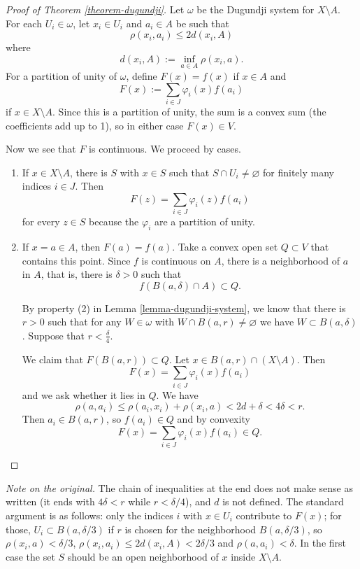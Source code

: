 \begin{proof}[Proof of Theorem
\ref{theorem-dugundji}]
Let $\omega$ be the Dugundji system for
$X\setminus A$. For each
$U_i\in\omega$, let $x_i\in U_i$ and
$a_i\in A$ be such that
$$
\rho(x_i,a_i)\leq2d(x_i,A)
$$
where
$$
d(x_i,A):=\inf_{a\in A}\rho(x_i,a).
$$
For a partition of unity of $\omega$,
define $F(x)=f(x)$ if $x\in A$ and
$$
F(x):=\sum_{i\in J}\varphi_i(x)f(a_i)
$$
if $x\in X\setminus A$. Since this is a
partition of unity, the sum is a convex
sum (the coefficients add up to 1), so
in either case $F(x)\in V$.

Now we see that $F$ is continuous. We
proceed by cases.
\begin{enumerate}
\item If $x\in X\setminus A$, there is
$S$ with $x\in S$ such that
$S\cap U_i\neq\varnothing$ for finitely
many indices $i\in J$. Then
$$
F(z)=\sum_{i\in J}\varphi_i(z)f(a_i)
$$
for every $z\in S$ because the
$\varphi_i$ are a partition of unity.

\item If $x=a\in A$, then $F(a)=f(a)$.
Take a convex open set $Q\subset V$
that contains this point. Since $f$ is
continuous on $A$, there is a
neighborhood of $a$ in $A$, that is,
there is $\delta>0$ such that
$$
f(B(a,\delta)\cap A)\subset Q.
$$

By property (2) in
Lemma \ref{lemma-dugundji-system}, we
know that there is $r>0$ such that for
any $W\in\omega$ with
$W\cap B(a,r)\neq\varnothing$ we have
$W\subset B(a,\delta)$. Suppose that
$r<\frac{\delta}{4}$.

We claim that $F(B(a,r))\subset Q$. Let
$x\in B(a,r)\cap(X\setminus A)$. Then
$$
F(x)=\sum_{i\in J}\varphi_i(x)f(a_i)
$$
and we ask whether it lies in $Q$. We
have
$$
\rho(a,a_i)
\leq\rho(a_i,x_i)+\rho(x_i,a)
<2d+\delta<4\delta<r.
$$
Then $a_i\in B(a,r)$, so $f(a_i)\in Q$
and by convexity
$$
F(x)=\sum_{i\in J}\varphi_i(x)f(a_i)
\in Q.
$$
\end{enumerate}
\end{proof}

\noindent
{\it Note on the original.} The chain of
inequalities at the end does not make
sense as written (it ends with
$4\delta<r$ while $r<\delta/4$), and
$d$ is not defined. The standard
argument is as follows: only the
indices $i$ with $x\in U_i$ contribute
to $F(x)$; for those,
$U_i\subset B(a,\delta/3)$ if $r$ is
chosen for the neighborhood
$B(a,\delta/3)$, so
$\rho(x_i,a)<\delta/3$,
$\rho(x_i,a_i)\leq2d(x_i,A)
<2\delta/3$ and
$\rho(a,a_i)<\delta$. In the first case
the set $S$ should be an open
neighborhood of $x$ inside
$X\setminus A$.

